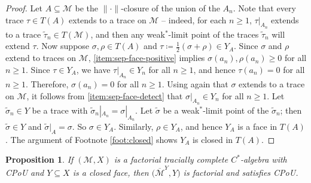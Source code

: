 \documentclass[a4paper,11pt]{amsart}
\newtheorem{proposition}[theorem]{Proposition}
\theoremstyle{definition}
\numberwithin{equation}{section}
\numberwithin{theorem}{section}
\newcommand{\M}{\mathcal{M}}
\newcommand{\completion}[2]{\overline{#1}^{#2}}
\begin{document}
\begin{proof}
Let $A\subseteq \M$ be the $\|\cdot\|$-closure of the union of the $A_n$.  
Note that every trace $\tau \in T(A)$ extends to a trace on $\M$ -- indeed, for each $n \geq 1$, $\tau|_{A_n}$ extends to a trace $\widetilde\tau_n \in T(\M)$, and then any weak$^*$-limit point of the traces $\widetilde\tau_n$ will extend $\tau$.  
Now suppose $\sigma, \rho \in T(A)$ and  $\tau \coloneqq \frac{1}{2}(\sigma + \rho) \in Y_A$.  
Since $\sigma$ and $\rho$ extend to traces on $\M$, \ref{item:sep-face-positive} implies $\sigma(a_n), \rho(a_n) \geq 0$ for all $n \geq 1$.  
Since $\tau \in Y_A$, we have $\tau|_{A_n} \in Y_n$ for all $n \geq 1$, and hence $\tau(a_n) = 0$ for all $n \geq 1$.  
Therefore, $\sigma(a_n)= 0$ for all $n \geq 1$.  
Using again that $\sigma$ extends to a trace on $\M$, it follows from \ref{item:sep-face-detect} that $\sigma|_{A_n} \in Y_n$ for all $n \geq 1$.  
Let $\widetilde\sigma_n \in Y$ be a trace with $\widetilde\sigma_n|_{A_n} = \sigma|_{A_n}$.  
Let $\widetilde\sigma$ be a weak$^*$-limit point of the $\widetilde\sigma_n$; then $\widetilde\sigma \in Y$ and $\widetilde\sigma|_{A} = \sigma$.  
So $\sigma \in Y_A$.  Similarly, $\rho \in Y_A$, and hence $Y_A$ is a face in $T(A)$. The argument of Footnote \ref{foot:closed} shows $Y_A$ is closed in $T(A)$.
\end{proof}

\begin{proposition}\label{prop:CPoU-quotient}
	If $(\mathcal M, X)$ is a factorial tracially complete $C^*$-algebra with CPoU and $Y \subseteq X$ is a closed face, then $\big(\completion{\mathcal M}{Y}, Y\big)$ is factorial and satisfies CPoU.
\end{proposition}
\end{document}
